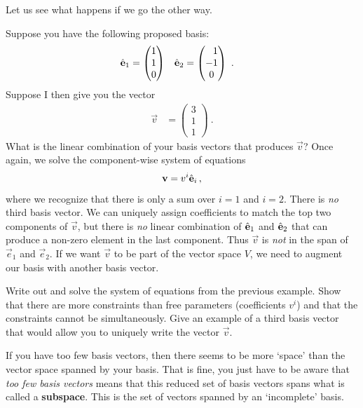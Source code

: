 Let us see what happens if we go the other way. 
\begin{example}
Suppose you have the following proposed basis:
\begin{align}
    \bas{e}_1 &=
    \begin{pmatrix}
        1\\
        1\\
        0
    \end{pmatrix}
    &
    \bas{e}_2 &=
    \begin{pmatrix}
        \pp 1\\
        -1\\
        0
    \end{pmatrix}
    \ .
    \label{eq:eg:too:few:basis:vectors:basis}
\end{align}
Suppose I then give you the vector
\begin{align}
    \vec{v} &=
    \begin{pmatrix}
        3 \\ 1 \\ 1
    \end{pmatrix} \ .
\end{align}
What is the linear combination of your basis vectors that produces $\vec{v}$? Once again, we solve the component-wise system of equations 
\begin{align}
    \mathbf{v}= v^i \hat{\mathbf{e}}_i \, ,
\end{align}
where we recognize that there is only a sum over $i=1$ and $i=2$. There is \emph{no} third basis vector. We can uniquely assign coefficients to match the top two components of $\vec{v}$, but there is \emph{no} linear combination of $\hat{\mathbf{e}}_1$ and $\hat{\mathbf{e}}_2$ that can produce a non-zero element in the last component. Thus $\vec{v}$ is \emph{not} in the span of $\vec{e}_1$ and $\vec{e}_2$. If we want $\vec{v}$ to be part of the vector space $V$, we need to augment our basis with another basis vector.
\end{example} 
\begin{exercise}
Write out and solve the system of equations from the previous example. Show that there are more constraints than free parameters (coefficients $v^i$) and that the constraints cannot be simultaneously. Give an example of a third basis vector that would allow you to uniquely write the vector $\vec{v}$.
\end{exercise}

If you have too few basis vectors, then there seems to be more `space' than the vector space spanned by your basis. That is fine, you just have to be aware that \emph{too few basis vectors} means that this reduced set of basis vectors spans what is called a \textbf{subspace}. This is the set of vectors spanned by an `incomplete' basis.



